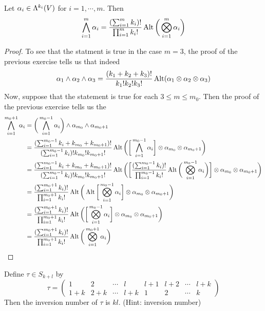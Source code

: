 \documentclass{book}
\begin{document}
	\begin{ex}
		Let $\alpha_i \in \Lambda^{k_i}(V)$ for $i =1, \cdots, m$. Then $$\bigwedge_{i=1}^m \alpha_i = \frac{(\sum_{i=1}^m k_i)!}{\prod_{i=1}^m k_i!} \operatorname{Alt} \bigg(\bigotimes_{i=1}^m \alpha_i \bigg)$$
	\end{ex}

	\begin{proof}
		To see that the statment is true in the case $m=3$, the proof of the previous exercise tells us that indeed $$\alpha_1 \wedge \alpha_2 \wedge \alpha_3 = \frac{(k_1 + k_2 + k_3)!}{k_1! k_2! k_3!}\operatorname{Alt}(\alpha_1 \otimes \alpha_2 \otimes \alpha_3)$$
		Now, suppose that the statement is true for each $3 \leq m \leq m_0$. Then the proof of the previous exercise tells us the 
		\begin{align*}
			\bigwedge_{i=1}^{m_0 +1} \alpha_i
			& = \bigg( \bigwedge_{i=1}^{m_0 -1} \alpha_i \bigg) \wedge \alpha_{m_0} \wedge \alpha_{m_0+1} \\
			& = \frac{(\sum_{i=1}^{m_0-1} k_i + k_{m_0} + k_{m_0+1})! }{(\sum_{i=1}^{m_0-1} k_i)! k_{m_0}! k_{m_0+1}!} \operatorname{Alt} \bigg( \bigg[ \bigwedge_{i=1}^{m_0-1} \alpha_i \bigg] \otimes \alpha_{m_0} \otimes \alpha_{m_0 +1}  \bigg) \\
			& = \frac{(\sum_{i=1}^{m_0-1} k_i + k_{m_0} + k_{m_0+1})! }{(\sum_{i=1}^{m_0-1} k_i)! k_{m_0}! k_{m_0+1}!} \operatorname{Alt} \bigg( \bigg[ \frac{(\sum_{i=1}^{m_0-1} k_i)!}{\prod_{i=1}^{m_0-1} k_i!} \operatorname{Alt} \bigg (\bigotimes_{i=1}^{m_0-1} \alpha_i \bigg) \bigg] \otimes \alpha_{m_0} \otimes \alpha_{m_0 +1}  \bigg) \\
			& = \frac{(\sum_{i=1}^{m_0+1} k_i)! }{ \prod_{i=1}^{m_0+1} k_i!}\operatorname{Alt} \bigg( \operatorname{Alt} \bigg [ \bigotimes_{i=1}^{m_0-1} \alpha_i \bigg] \otimes \alpha_{m_0} \otimes \alpha_{m_0 +1}  \bigg) \\
			& = \frac{(\sum_{i=1}^{m_0+1} k_i)! }{ \prod_{i=1}^{m_0+1} k_i!}\operatorname{Alt} \bigg( \bigg [ \bigotimes_{i=1}^{m_0-1} \alpha_i \bigg] \otimes \alpha_{m_0} \otimes \alpha_{m_0 +1}  \bigg) \\
			& = \frac{(\sum_{i=1}^{m_0+1} k_i)! }{ \prod_{i=1}^{m_0+1} k_i!}\operatorname{Alt} \bigg(  \bigotimes_{i=1}^{m_0+1} \alpha_i   \bigg) 
		\end{align*}
	\end{proof}
	
	\begin{ex}
		Define $\tau \in S_{k+l}$ by 
		\[\tau = 
		\begin{pmatrix}
			1 & 2 & \cdots &l &l+1 & l+2 & \cdots & l+k \\
			1+k & 2+ k & \cdots & l+k & 1 & 2 & \cdots & k 
		\end{pmatrix} 
		\]
		Then the inversion number of $\tau$ is $kl$.
		(Hint: inversion number)
	\end{ex}
\end{document}
